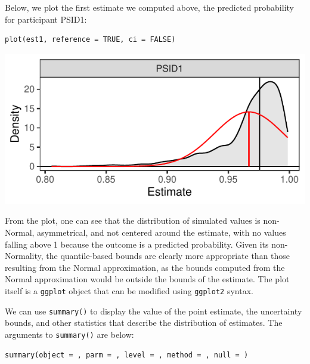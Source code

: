 Below, we plot the first estimate we computed above, the predicted probability for participant PSID1:

\begin{verbatim}
plot(est1, reference = TRUE, ci = FALSE)
\end{verbatim}

\begin{center}\includegraphics{figures/unnamed-chunk-8-1} \end{center}

From the plot, one can see that the distribution of simulated values is non-Normal, asymmetrical, and not centered around the estimate, with no values falling above 1 because the outcome is a predicted probability. Given its non-Normality, the quantile-based bounds are clearly more appropriate than those resulting from the Normal approximation, as the bounds computed from the Normal approximation would be outside the bounds of the estimate. The plot itself is a \texttt{ggplot} object that can be modified using \texttt{ggplot2} syntax.

We can use \texttt{summary()} to display the value of the point estimate, the uncertainty bounds, and other statistics that describe the distribution of estimates. The arguments to \texttt{summary()} are below:

\begin{verbatim}
summary(object = , parm = , level = , method = , null = )
\end{verbatim}

